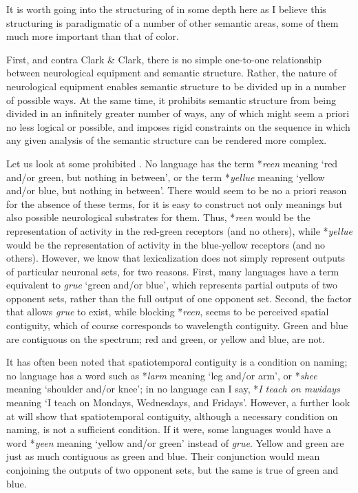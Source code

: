 It is worth going into the structuring of  in some depth here as I believe this structuring is paradigmatic of a number of other semantic areas, some of them much more important than that of color.

First, and contra Clark \& Clark, there is no simple one-to-one relationship between neurological equipment and semantic structure. Rather, the nature of neurological equipment enables semantic structure to be divided up in a number of possible ways. At the same time, it prohibits semantic structure from being divided in an infinitely greater number of ways, any of which might seem a priori no less logical or possible, and imposes rigid constraints on the sequence in which any given analysis of the semantic structure can be rendered more complex.

Let us look at some prohibited . No language has the term *\textit{reen} meaning `red and/or green, but nothing in between', or the term *\textit{yellue} meaning `yellow and/or blue, but nothing in between'. There would seem to be no a priori reason for the absence of these terms, for it is easy to construct not only meanings but also possible neurological substrates for them. Thus, *\textit{reen} would be the representation of activity in the red-green receptors (and no others), while *\textit{yellue} would be the representation of activity in the blue-yellow receptors (and no others). However, we know that lexicalization does not simply represent outputs of particular neuronal sets, for two reasons. First, many languages have a term equivalent to \textit{grue} `green and/or blue', which represents partial outputs of two opponent sets, rather than the full output of one opponent set. Second, the factor that allows \textit{grue} to exist, while blocking *\textit{reen}, seems to be perceived spatial contiguity, which of course corresponds to wavelength contiguity. Green and blue are contiguous on the spectrum; red and green, or yellow and blue, are not.

It has often been noted that spatiotemporal contiguity is a condition on naming; no language has a word such as *\textit{larm} meaning `leg and/or arm', or *\textit{shee} meaning `shoulder and/or knee'; in no language can I say, *\textit{I teach on mwidays} meaning `I teach on Mondays, Wednesdays, and Fridays'. However, a further look at  will show that spatiotemporal contiguity, although a necessary condition on naming, is not a sufficient condition. If it were, some languages would have a word *\textit{yeen} meaning `yellow and/or green' instead of \textit{grue}. Yellow and green are just as much contiguous as green and blue. Their conjunction would mean conjoining the outputs of two opponent sets, but the same is true of green and blue.

